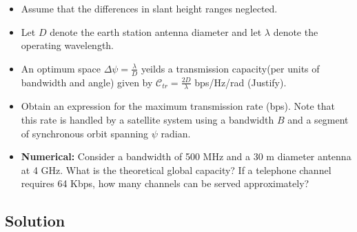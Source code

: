 \documentclass[titlepage]{article}
\begin{document}
\begin{tcolorbox}
    \begin{itemize}
        \item Assume that the differences in slant height ranges neglected.
        \item Let $D$ denote the earth station antenna diameter and let $\lambda$ denote the operating wavelength.
        \item An optimum space $\Delta\psi = \frac{\lambda}{D}$ yeilds a transmission capacity(per units of bandwidth and angle) given by $\mathcal{C}_{tr}=\frac{2D}{\lambda}$ bps/Hz/rad (Justify).
        \item Obtain an expression for the maximum transmission rate (bps). Note that this rate is handled by a satellite system using a bandwidth $B$ and a segment of synchronous orbit spanning $\psi$ radian.
        \item \textbf{Numerical:} Consider a bandwidth of 500 MHz and a 30 m diameter antenna at 4 GHz. What is the theoretical global capacity? If a telephone channel requires 64 Kbps, how many channels can be served approximately?
    \end{itemize}
\end{tcolorbox}

\subsection{Solution}
\end{document}
